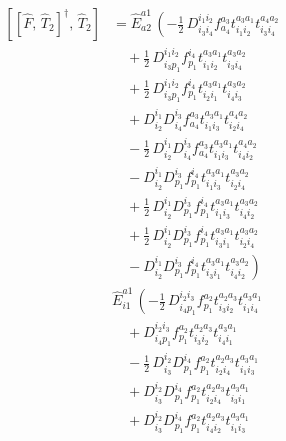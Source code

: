 \documentclass[11pt]{article}
\begin{document}
\begin{align}
\left[\left[\hat{F},\, \hat{T}_{2}\right]^{\dagger},\, \hat{T}_{2}\right] &= \hat{E}^{a1}_{a2}\,\left(- \tfrac{1}{2}\, D^{i_{1}i_{2}}_{i_{3}i_{4}} f^{a_{3}}_{a_{4}} t^{a_{3}a_{1}}_{i_{1}i_{2}} t^{a_{4}a_{2}}_{i_{3}i_{4}} \right. \\
&\left.\quad + \tfrac{1}{2}\, D^{i_{1}i_{2}}_{i_{3}p_{1}} f^{i_{4}}_{p_{1}} t^{a_{3}a_{1}}_{i_{1}i_{2}} t^{a_{3}a_{2}}_{i_{3}i_{4}} \right. \\
&\left.\quad + \tfrac{1}{2}\, D^{i_{1}i_{2}}_{i_{3}p_{1}} f^{i_{4}}_{p_{1}} t^{a_{3}a_{1}}_{i_{2}i_{1}} t^{a_{3}a_{2}}_{i_{4}i_{3}} \right. \\
&\left.\quad + D^{i_{1}}_{i_{2}} D^{i_{3}}_{i_{4}} f^{a_{3}}_{a_{4}} t^{a_{3}a_{1}}_{i_{1}i_{3}} t^{a_{4}a_{2}}_{i_{2}i_{4}} \right. \\
&\left.\quad - \tfrac{1}{2}\, D^{i_{1}}_{i_{2}} D^{i_{3}}_{i_{4}} f^{a_{3}}_{a_{4}} t^{a_{3}a_{1}}_{i_{1}i_{3}} t^{a_{4}a_{2}}_{i_{4}i_{2}} \right. \\
&\left.\quad - D^{i_{1}}_{i_{2}} D^{i_{3}}_{p_{1}} f^{i_{4}}_{p_{1}} t^{a_{3}a_{1}}_{i_{1}i_{3}} t^{a_{3}a_{2}}_{i_{2}i_{4}} \right. \\
&\left.\quad + \tfrac{1}{2}\, D^{i_{1}}_{i_{2}} D^{i_{3}}_{p_{1}} f^{i_{4}}_{p_{1}} t^{a_{3}a_{1}}_{i_{1}i_{3}} t^{a_{3}a_{2}}_{i_{4}i_{2}} \right. \\
&\left.\quad + \tfrac{1}{2}\, D^{i_{1}}_{i_{2}} D^{i_{3}}_{p_{1}} f^{i_{4}}_{p_{1}} t^{a_{3}a_{1}}_{i_{3}i_{1}} t^{a_{3}a_{2}}_{i_{2}i_{4}} \right. \\
&\left.\quad - D^{i_{1}}_{i_{2}} D^{i_{3}}_{p_{1}} f^{i_{4}}_{p_{1}} t^{a_{3}a_{1}}_{i_{3}i_{1}} t^{a_{3}a_{2}}_{i_{4}i_{2}} \right) \\
&\hat{E}^{a1}_{i1}\,\left(- \tfrac{1}{2}\, D^{i_{2}i_{3}}_{i_{4}p_{1}} f^{a_{2}}_{p_{1}} t^{a_{2}a_{3}}_{i_{3}i_{2}} t^{a_{3}a_{1}}_{i_{1}i_{4}} \right. \\
&\left.\quad + D^{i_{2}i_{3}}_{i_{4}p_{1}} f^{a_{2}}_{p_{1}} t^{a_{2}a_{3}}_{i_{3}i_{2}} t^{a_{3}a_{1}}_{i_{4}i_{1}} \right. \\
&\left.\quad - \tfrac{1}{2}\, D^{i_{2}}_{i_{3}} D^{i_{4}}_{p_{1}} f^{a_{2}}_{p_{1}} t^{a_{2}a_{3}}_{i_{2}i_{4}} t^{a_{3}a_{1}}_{i_{1}i_{3}} \right. \\
&\left.\quad + D^{i_{2}}_{i_{3}} D^{i_{4}}_{p_{1}} f^{a_{2}}_{p_{1}} t^{a_{2}a_{3}}_{i_{2}i_{4}} t^{a_{3}a_{1}}_{i_{3}i_{1}} \right. \\
&\left.\quad + D^{i_{2}}_{i_{3}} D^{i_{4}}_{p_{1}} f^{a_{2}}_{p_{1}} t^{a_{2}a_{3}}_{i_{4}i_{2}} t^{a_{3}a_{1}}_{i_{1}i_{3}} \right. \\

\end{align}
\end{document}
